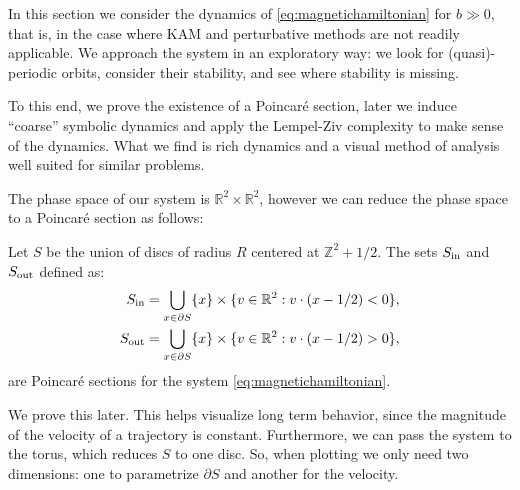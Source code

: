 In this section we consider the dynamics of \eqref{eq:magnetichamiltonian} for $b\gg 0$, that is, in the case where KAM and perturbative methods are not readily applicable. We approach the system in an exploratory way: we look for (quasi)-periodic orbits, consider their stability, and see where stability is missing.

To this end, we prove the existence of a Poincar\'e section, later we induce ``coarse'' symbolic dynamics and apply the Lempel-Ziv complexity to make sense of the dynamics. What we find is rich dynamics and a visual method of analysis well suited for similar problems.

The phase space of our system is $\mathbb R^2\times\mathbb R^2$, however we can reduce the phase space to a Poincar\'e section as follows:
\begin{proposition}\label{prop:poincaresurface}
Let $S$ be the union of discs of radius $R$ centered at $\mathbb Z^2+1/2$. The sets $S_\text{in}$ and $S_\text{out}$ defined as:
\begin{align}
\label{def:poincaresectionIN}
S_\text{in} &= \bigcup_{x\in\partial S} \{x\} \times \{v\in\mathbb R^2 : v\cdot (x-1/2) < 0\},\\
\label{def:poincaresectionOUT}
S_\text{out} &= \bigcup_{x\in\partial S} \{x\} \times \{v\in\mathbb R^2 : v\cdot (x-1/2) > 0\},
\end{align}
are Poincar\'e sections for the system \eqref{eq:magnetichamiltonian}.
\end{proposition}
We prove this later. This helps visualize long term behavior, since the magnitude of the velocity of a trajectory is constant. Furthermore, we can pass the system to the torus, which reduces $S$ to one disc. So, when plotting we only need two dimensions: one to parametrize $\partial S$ and another for the velocity.